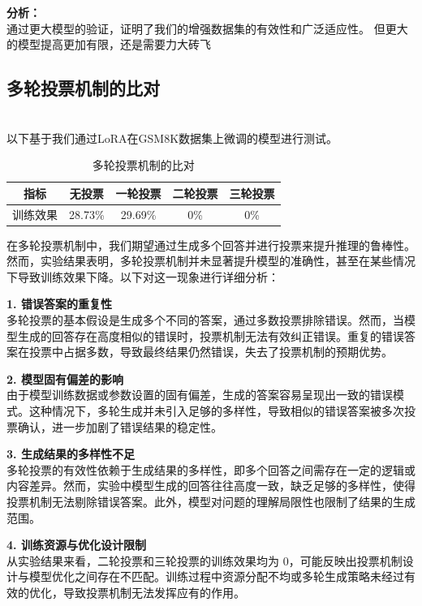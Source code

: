 \documentclass{article}
\begin{document}
\textbf{分析：}\\
通过更大模型的验证，证明了我们的增强数据集的有效性和广泛适应性。
但更大的模型提高更加有限，还是需要力大砖飞


\subsection{多轮投票机制的比对}
\\以下基于我们通过LoRA在GSM8K数据集上微调的模型进行测试。
\begin{table}[H]
  \caption{多轮投票机制的比对}
  \label{voting-mechanism-comparison}
  \centering
  \begin{tabular}{|c|c|c|c|c|}
    \hline
    \textbf{指标} & \textbf{无投票} & \textbf{一轮投票}  & \textbf{二轮投票}& \textbf{三轮投票}\\ \hline 
    训练效果 & 28.73\% & 29.69\% & 0\%& 0\% \\ \hline
  \end{tabular}
\end{table}

在多轮投票机制中，我们期望通过生成多个回答并进行投票来提升推理的鲁棒性。然而，实验结果表明，多轮投票机制并未显著提升模型的准确性，甚至在某些情况下导致训练效果下降。以下对这一现象进行详细分析：


\textbf{1. 错误答案的重复性}\\
多轮投票的基本假设是生成多个不同的答案，通过多数投票排除错误。然而，当模型生成的回答存在高度相似的错误时，投票机制无法有效纠正错误。重复的错误答案在投票中占据多数，导致最终结果仍然错误，失去了投票机制的预期优势。

\textbf{2. 模型固有偏差的影响}\\
由于模型训练数据或参数设置的固有偏差，生成的答案容易呈现出一致的错误模式。这种情况下，多轮生成并未引入足够的多样性，导致相似的错误答案被多次投票确认，进一步加剧了错误结果的稳定性。

\textbf{3. 生成结果的多样性不足}\\
多轮投票的有效性依赖于生成结果的多样性，即多个回答之间需存在一定的逻辑或内容差异。然而，实验中模型生成的回答往往高度一致，缺乏足够的多样性，使得投票机制无法剔除错误答案。此外，模型对问题的理解局限性也限制了结果的生成范围。

\textbf{4. 训练资源与优化设计限制}\\
从实验结果来看，二轮投票和三轮投票的训练效果均为 $0$，可能反映出投票机制设计与模型优化之间存在不匹配。训练过程中资源分配不均或多轮生成策略未经过有效的优化，导致投票机制无法发挥应有的作用。
\end{document}
